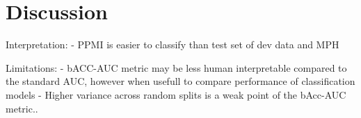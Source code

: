\section{Discussion}
\label{sec:discussion}







 


Interpretation:
- PPMI is easier to classify than test set of dev data and MPH 




Limitations: 
- bACC-AUC metric may be less human interpretable compared to the standard AUC, 
however when usefull to compare performance of classification models
- Higher variance across random splits is a weak point of the bAcc-AUC metric..




